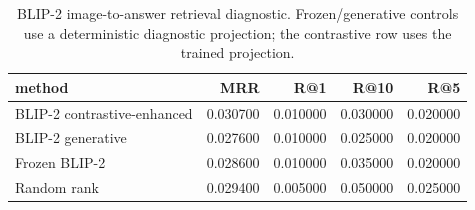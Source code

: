\begin{table}
\caption{BLIP-2 image-to-answer retrieval diagnostic. Frozen/generative controls use a deterministic diagnostic projection; the contrastive row uses the trained projection.}
\label{tab:rq2_retrieval}
\begin{tabular}{lrrrr}
\toprule
method & MRR & R@1 & R@10 & R@5 \\
\midrule
BLIP-2 contrastive-enhanced & 0.030700 & 0.010000 & 0.030000 & 0.020000 \\
BLIP-2 generative & 0.027600 & 0.010000 & 0.025000 & 0.020000 \\
Frozen BLIP-2 & 0.028600 & 0.010000 & 0.035000 & 0.020000 \\
Random rank & 0.029400 & 0.005000 & 0.050000 & 0.025000 \\
\bottomrule
\end{tabular}
\end{table}
